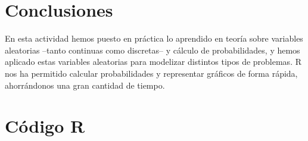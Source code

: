 \documentclass[12pt,a4paper,twoside,openright,titlepage,final]{article}
\begin{document}
\section{Conclusiones}

En esta actividad hemos puesto en práctica lo aprendido en teoría sobre variables aleatorias --tanto continuas como discretas-- y cálculo de probabilidades, y hemos aplicado estas variables aleatorias para modelizar distintos tipos de problemas. R nos ha permitido calcular probabilidades y representar gráficos de forma rápida, ahorrándonos una gran cantidad de tiempo. 

\newpage

\section{Código R}


\end{document}

